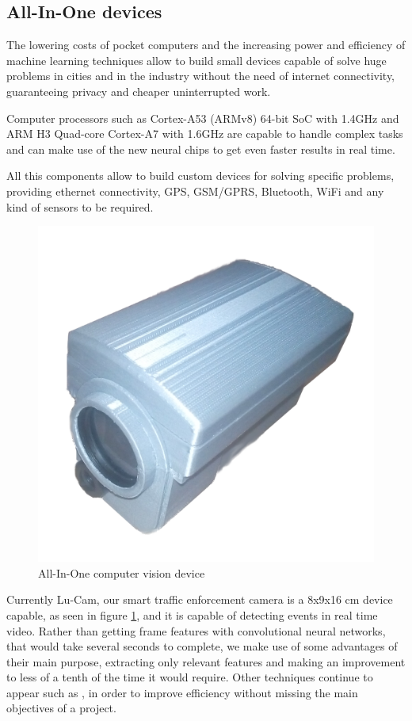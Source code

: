 \documentclass[fleqn,12pt]{SelfArx} %
\begin{document}
\subsection{All-In-One devices}

The lowering costs of pocket computers and the increasing power and efficiency of machine learning techniques allow to build small devices capable of solve huge problems in cities and in the industry without the need of internet connectivity, guaranteeing privacy and cheaper uninterrupted work.

Computer processors such as Cortex-A53 (ARMv8) 64-bit SoC with 1.4GHz and ARM H3 Quad-core Cortex-A7 with 1.6GHz are capable to handle complex tasks and can make use of the new neural chips to get even faster results in real time.

All this components allow to build custom devices for solving specific problems, providing ethernet connectivity, GPS, GSM/GPRS, Bluetooth, WiFi and any kind of sensors to be required.

\begin{figure}[t]\centering
	\includegraphics[width=\linewidth]{images/lucam_005}
	\caption{All-In-One computer vision device}
	\label{fig:device}
\end{figure}

Currently Lu-Cam, our smart traffic enforcement camera is a 8x9x16 cm device capable, as seen in figure \ref{fig:device}, and it is capable of detecting events in real time video. Rather than getting frame features with convolutional neural networks, that would take several seconds to complete, we make use of some advantages of their main purpose, extracting only relevant features and making an improvement to less of a tenth of the time it would require. Other techniques continue to appear such as \cite{Cavigelli:2017:CCI:3131885.3131906}, in order to improve efficiency without missing the main objectives of a project.
\end{document}

